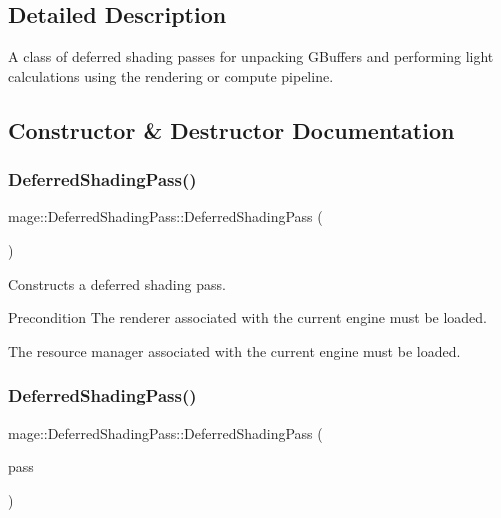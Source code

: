 \subsection{Detailed Description}
A class of deferred shading passes for unpacking G\+Buffers and performing light calculations using the rendering or compute pipeline. 

\subsection{Constructor \& Destructor Documentation}
\hypertarget{classmage_1_1_deferred_shading_pass_a348c86ce12342110299739d8d63c6aaf}{}\label{classmage_1_1_deferred_shading_pass_a348c86ce12342110299739d8d63c6aaf} 
\subsubsection{\texorpdfstring{Deferred\+Shading\+Pass()}{DeferredShadingPass()}\hspace{0.1cm}{\footnotesize\ttfamily [1/3]}}
{\footnotesize\ttfamily mage\+::\+Deferred\+Shading\+Pass\+::\+Deferred\+Shading\+Pass (\begin{DoxyParamCaption}{ }\end{DoxyParamCaption})}

Constructs a deferred shading pass.

\begin{DoxyPrecond}{Precondition}
The renderer associated with the current engine must be loaded. 

The resource manager associated with the current engine must be loaded. 
\end{DoxyPrecond}
\hypertarget{classmage_1_1_deferred_shading_pass_a781dc7d7aab0a0f7ff2e95376a4db64b}{}\label{classmage_1_1_deferred_shading_pass_a781dc7d7aab0a0f7ff2e95376a4db64b} 
\subsubsection{\texorpdfstring{Deferred\+Shading\+Pass()}{DeferredShadingPass()}\hspace{0.1cm}{\footnotesize\ttfamily [2/3]}}
{\footnotesize\ttfamily mage\+::\+Deferred\+Shading\+Pass\+::\+Deferred\+Shading\+Pass (\begin{DoxyParamCaption}\item[{const \hyperlink{classmage_1_1_deferred_shading_pass}{Deferred\+Shading\+Pass} \&}]{pass }\end{DoxyParamCaption})\hspace{0.3cm}{\ttfamily [delete]}}

